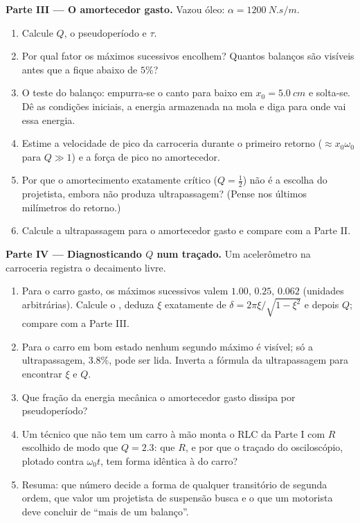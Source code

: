 \begin{problem}
\medskip
\noindent\textbf{Parte III --- O amortecedor gasto.}
Vazou óleo: $\alpha = \qty{1200}{N.s/m}$.
\begin{enumerate}[resume]
  \item Calcule $Q$, o pseudoperíodo e $\tau$.
  \item Por qual fator os máximos sucessivos encolhem? Quantos balanços
        são visíveis antes que a  fique abaixo de $5\%$?
  \item O teste do balanço: empurra-se o canto para baixo em $x_0 =
        \qty{5.0}{cm}$ e solta-se. Dê as condições iniciais, a
        energia armazenada na mola e diga para onde vai essa energia.
  \item Estime a velocidade de pico da carroceria durante o primeiro
        retorno ($\approx x_0\omega_0$ para $Q \gg 1$) e a força de pico
        no amortecedor.
  \item Por que o amortecimento exatamente crítico ($Q = \tfrac12$) não é a
        escolha do projetista, embora não produza ultrapassagem? (Pense nos
        últimos milímetros do retorno.)
  \item Calcule a ultrapassagem para o amortecedor gasto e compare com a
        Parte II.
\end{enumerate}

\medskip
\noindent\textbf{Parte IV --- Diagnosticando $Q$ num traçado.}
Um acelerômetro na carroceria registra o decaimento livre.
\begin{enumerate}[resume]
  \item Para o carro gasto, os máximos sucessivos valem $1.00$, $0.25$, $0.062$
        (unidades arbitrárias). Calcule o , deduza
        $\xi$ exatamente de $\delta = 2\pi\xi/\sqrt{1 - \xi^2}$ e depois $Q$;
        compare com a Parte III.
  \item Para o carro em bom estado nenhum segundo máximo é visível; só a
        ultrapassagem, $3.8\%$, pode ser lida. Inverta a fórmula da ultrapassagem para
        encontrar $\xi$ e $Q$.
  \item Que fração da energia mecânica o amortecedor gasto
        dissipa por pseudoperíodo?
  \item Um técnico que não tem um carro à mão monta o RLC da Parte I
        com $R$ escolhido de modo que $Q = 2.3$: que $R$, e por que o
        traçado do osciloscópio, plotado contra $\omega_0 t$, tem forma idêntica
        à do carro?
  \item Resuma: que número  decide a forma de qualquer
        transitório de segunda ordem, que valor um projetista de suspensão
        busca e o que um motorista deve concluir de ``mais de um
        balanço''.
\end{enumerate}
\end{problem}
